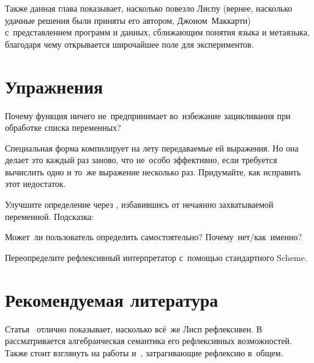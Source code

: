 Также данная глава показывает, насколько повезло Лиспу (вернее, насколько
удачные решения были приняты его автором, Джоном~Маккарти) с~представлением
программ и данных, сближающим понятия языка и метаязыка, благодаря чему
открывается широчайшее поле для экспериментов.


\section{Упражнения}\label{reflection/sect:exercises}

\begin{exercise}\label{reflection/ex:no-cycles}
Почему функция  ничего не~предпринимает во~избежание
зацикливания при обработке списка переменных?
\end{exercise}

\begin{exercise}\label{reflection/ex:optimize-ce}
Специальная форма  компилирует на лету передаваемые ей выражения.
Но она делает это каждый раз заново, что не~особо эффективно, если требуется
вычислить одно и то~же выражение несколько раз. Придумайте, как исправить этот
недостаток.
\end{exercise}

\begin{exercise}\label{reflection/ex:no-capture}
Улучшите определение  через , избавившись от нечаянно
захватываемой переменной. Подсказка: 
\end{exercise}

\begin{exercise}\label{reflection/ex:defined}
Может~ли пользователь определить  самостоятельно?
Почему~нет\slash как~именно?
\end{exercise}

\begin{exercise}\label{reflection/ex:rnrs}
Переопределите рефлексивный интерпретатор с~помощью стандартного Scheme.
\end{exercise}


\section*{Рекомендуемая литература}\label{reflection/sect:recommended-reading}

Статья~\cite{dr87} отлично показывает, насколько всё~же Лисп рефлексивен.
В~\cite{mul92} рассматривается алгебраическая семантика его рефлексивных
возможностей. Также стоит взглянуть на работы \cite{jf92} и~\cite{imy92},
затрагивающие рефлексию в~общем.
